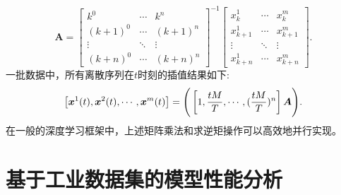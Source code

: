 \begin{equation}
\boldsymbol{A}=\left[\begin{array}{ccc}
k^{0} & \cdots & k^{n} \\
(k+1)^0 & \cdots & (k+1)^{n} \\
\vdots & \ddots & \vdots \\
(k+n)^0 & \cdots & (k+n)^{n}
\end{array}\right]^{-1}\left[\begin{array}{ccc}
x_{k}^{1} & \cdots & x_{k}^{m} \\
x_{k+1}^{1} & \cdots & x_{k+1}^{m} \\
\vdots & \ddots & \vdots \\
x_{k+n}^{1} & \cdots & x_{k+n}^{m}
\end{array}\right].
\end{equation}
一批数据中，所有离散序列在$t$时刻的插值结果如下:
\begin{equation}
\left[\boldsymbol x^1(t),\boldsymbol x^2(t),\cdots,\boldsymbol x^m(t)\right]= \Bigg(\left[ 1, \frac{tM}{T},\cdots, (\frac{tM}{T})^n\right]\boldsymbol{A}\Bigg). 
\end{equation}
在一般的深度学习框架中，上述矩阵乘法和求逆矩操作可以高效地并行实现。

\section{基于工业数据集的模型性能分析}
\label{sec:case}

